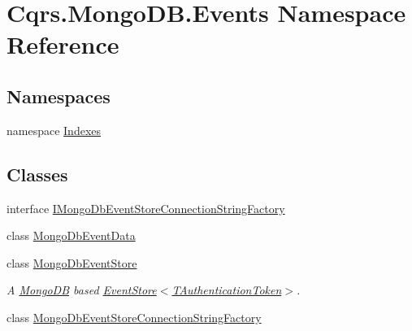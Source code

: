 \hypertarget{namespaceCqrs_1_1MongoDB_1_1Events}{}\section{Cqrs.\+Mongo\+D\+B.\+Events Namespace Reference}
\label{namespaceCqrs_1_1MongoDB_1_1Events}
\subsection*{Namespaces}
\begin{DoxyCompactItemize}
\item 
namespace \hyperlink{namespaceCqrs_1_1MongoDB_1_1Events_1_1Indexes}{Indexes}
\end{DoxyCompactItemize}
\subsection*{Classes}
\begin{DoxyCompactItemize}
\item 
interface \hyperlink{interfaceCqrs_1_1MongoDB_1_1Events_1_1IMongoDbEventStoreConnectionStringFactory}{I\+Mongo\+Db\+Event\+Store\+Connection\+String\+Factory}
\item 
class \hyperlink{classCqrs_1_1MongoDB_1_1Events_1_1MongoDbEventData}{Mongo\+Db\+Event\+Data}
\item 
class \hyperlink{classCqrs_1_1MongoDB_1_1Events_1_1MongoDbEventStore}{Mongo\+Db\+Event\+Store}
\begin{DoxyCompactList}\small\item\em A \hyperlink{namespaceCqrs_1_1MongoDB}{Mongo\+DB} based \hyperlink{classCqrs_1_1Events_1_1EventStore_a6346cb2aea4c5b4e740dc6cfb15abab8_a6346cb2aea4c5b4e740dc6cfb15abab8}{Event\+Store$<$\+T\+Authentication\+Token$>$}. \end{DoxyCompactList}\item 
class \hyperlink{classCqrs_1_1MongoDB_1_1Events_1_1MongoDbEventStoreConnectionStringFactory}{Mongo\+Db\+Event\+Store\+Connection\+String\+Factory}
\end{DoxyCompactItemize}
